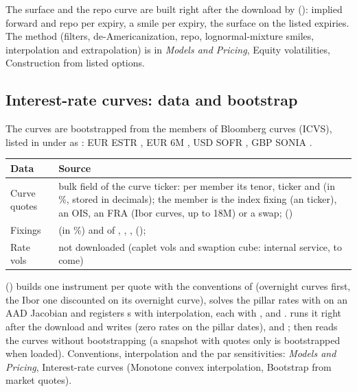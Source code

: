 The surface and the repo curve are built right after the download by 
(): implied forward and repo per expiry, a smile per expiry, the surface on the
listed expiries. The method (filters, de-Americanization, repo, lognormal-mixture smiles, interpolation and
extrapolation) is in \emph{Models and Pricing}, Equity volatilities, Construction from listed options.

\subsection{Interest-rate curves: data and bootstrap}\label{sec:arch-ir-data}
The curves are bootstrapped from the members of Bloomberg curves (ICVS), listed in  under
 as : EUR ESTR , EUR 6M ,
USD SOFR , GBP SONIA .

\begin{center}
\small
\begin{tabular}{@{}L{2.6cm}L{12.6cm}@{}}
\toprule
Data & Source \\
\midrule
Curve quotes & bulk field  of the curve ticker: per member its tenor, ticker and
   (in \%, stored in decimals); the member is the index fixing (an  ticker), an OIS, an FRA
  (Ibor curves, up to 18M) or a swap;  () \\
Fixings &  (in \%) and  of , , ,
   ();  \\
Rate vols & not downloaded (caplet vols and swaption cube: internal service, to come) \\
\bottomrule
\end{tabular}
\end{center}

 () builds one instrument per quote with the
conventions of  (overnight curves first, the Ibor one discounted on its overnight curve), solves
the pillar rates with  on an AAD Jacobian and registers s with 
interpolation, each with ,  and .
 runs it right after the download and writes  (zero rates on the pillar
dates),  and ;  then reads the curves
without bootstrapping (a snapshot with quotes only is bootstrapped when loaded). Conventions, interpolation and the
par sensitivities: \emph{Models and Pricing}, Interest-rate curves (Monotone convex interpolation, Bootstrap from
market quotes).

